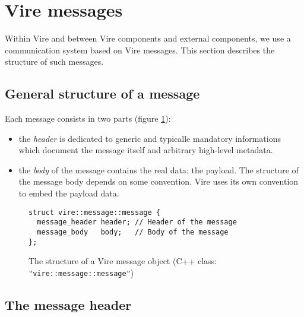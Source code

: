 
\section{Vire messages}\label{app:vire_messages}

Within Vire  and between Vire  components and external  components, we
use  a communication  system  based on  Vire  messages.  This  section
describes the structure of such messages.

\subsection{General structure of a message}

Each message consists in two parts (figure \ref{fig-vire-message-message-cpp}):
\begin{itemize}

\item  the  \emph{header}  is   dedicated  to  generic  and  typicalle
  mandatory  informations  which  document   the  message  itself  and
  arbitrary high-level metadata.

\item  the \emph{body}  of the  message  contains the  real data: the payload.
  The structure of the message body depends on some convention. Vire uses
  its own convention to embed the payload data.

\end{itemize}

\begin{figure}[h]
\vskip 10pt
\small
\begin{Verbatim}[frame=single,xleftmargin=0.cm,label=\fbox{C++}]
struct vire::message::message {
  message_header header; // Header of the message
  message_body   body;   // Body of the message
};
\end{Verbatim}
\normalsize
\caption{The structure of a Vire message object (C++  class:
  \texttt{"vire::message::message"})}\label{fig-vire-message-message-cpp}
\end{figure}

\subsection{The message header}

